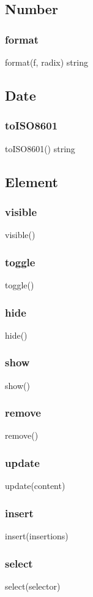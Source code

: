 {{\subsection{Number}
\subsubsection*{format}
format(f, radix) \rightarrow string

\subsection{Date}
\subsubsection*{toISO8601}
toISO8601() \rightarrow string

\subsection{Element}
\subsubsection*{visible}
visible()
\subsubsection*{toggle}
toggle()
\subsubsection*{hide}
hide()
\subsubsection*{show}
show()
\subsubsection*{remove}
remove()
\subsubsection*{update}
update(content)
\subsubsection*{insert}
insert(insertions)
\subsubsection*{select}
select(selector)

}}
